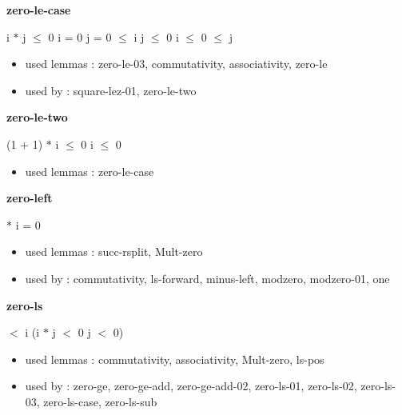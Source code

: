 \documentclass[a4paper]{article}
\begin{document}
\medskip

\bigskip

{\large\bf zero-le-case}

\medskip

 \Fol i $*$ j $\le$ 0 \Equiv i = 0 \Or j = 0  $\le$ i \And j $\le$ 0 \Or i $\le$ 0  $\le$ j

\begin{itemize}


\item       used lemmas  : zero-le-03, commutativity, associativity, zero-le
\item       used by      : square-lez-01, zero-le-two

\end{itemize}

\medskip

\bigskip

{\large\bf zero-le-two}

\medskip

 \Fol (1 + 1) $*$ i $\le$ 0 \Equiv i $\le$ 0

\begin{itemize}


\item       used lemmas  : zero-le-case

\end{itemize}

\medskip

\bigskip

{\large\bf zero-left}

\medskip

  $*$ i = 0

\begin{itemize}


\item       used lemmas  : succ-rsplit, Mult-zero
\item       used by      : commutativity, ls-forward, minus-left, modzero, modzero-01, one

\end{itemize}

\medskip

\bigskip

{\large\bf zero-ls}

\medskip

  $<$ i \Imp (i $*$ j $<$ 0 \Equiv j $<$ 0)

\begin{itemize}


\item       used lemmas  : commutativity, associativity, Mult-zero, ls-pos
\item       used by      : zero-ge, zero-ge-add, zero-ge-add-02, zero-ls-01, zero-ls-02, zero-ls-03, zero-ls-case, zero-ls-sub

\end{itemize}
\end{document}
